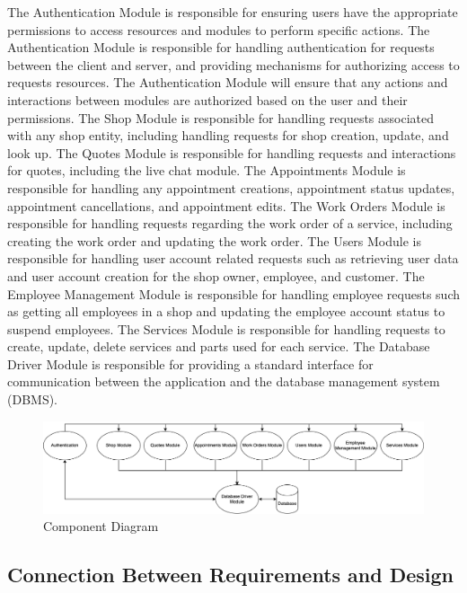 \documentclass[12pt, titlepage]{article}
\begin{document}
The Authentication Module is responsible for ensuring users have the appropriate permissions to
access resources and modules to perform specific actions. The Authentication Module is responsible
for handling authentication for requests between the client and server, and providing mechanisms
for authorizing access to requests resources. The Authentication Module will ensure that any
actions and interactions between modules are authorized based on the user and their permissions.
The Shop Module is responsible for handling requests associated with any shop entity, including
handling requests for shop creation, update, and look up. The Quotes Module is responsible for
handling requests and interactions for quotes, including the live chat module. The Appointments
Module is responsible for handling any appointment creations, appointment status updates,
appointment cancellations, and appointment edits. The Work Orders Module is responsible for
handling requests regarding the work order of a service, including creating the work order and
updating the work order. The Users Module is responsible for handling user account related requests
such as retrieving user data and user account creation for the shop owner, employee, and customer.
The Employee Management Module is responsible for handling employee requests such as getting all
employees in a shop and updating the employee account status to suspend employees. The Services
Module is responsible for handling requests to create, update, delete services and parts used for
each service. The Database Driver Module is responsible for providing a standard interface for
communication between the application and the database management system (DBMS).

\begin{figure}[H]
	\centering
	\includegraphics[width=\textwidth]{./diagrams/component-diagram.png}
	\caption{Component Diagram}
	\label{ComponentDiagram}
\end{figure}

\subsection{Connection Between Requirements and Design} \label{SecConnection}
\end{document}
